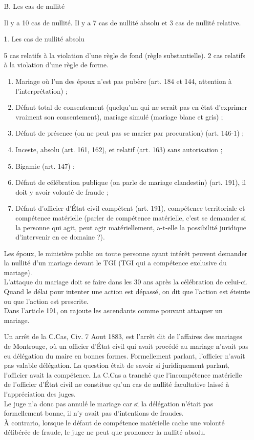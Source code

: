 \documentclass[12pt, a4paper, openany]{book}
\begin{document}
B. Les cas de nullité


Il y a 10 cas de nullité. Il y a 7 cas de nullité absolu et 3 cas de nullité relative. 


1. Les cas de nullité absolu


5 cas relatifs à la violation d'une règle de fond (règle substantielle). 
2 cas relatifs à la violation d'une règle de forme. 

\begin{enumerate}
\item Mariage où l'un des époux n'est pas pubère (art. 184 et 144, attention à l'interprétation) ;
\item Défaut total de consentement (quelqu'un qui ne serait pas en état d'exprimer vraiment son consentement), mariage simulé (mariage blanc et gris) ;
\item Défaut de présence (on ne peut pas se marier par procuration) (art. 146-1) ; 
\item Inceste, absolu (art. 161, 162), et relatif (art. 163) sans autorisation ;
\item Bigamie (art. 147) ; 
\item Défaut de célébration publique (on parle de mariage clandestin) (art. 191), il doit y avoir volonté de fraude ;
\item Défaut d'officier d'État civil compétent (art. 191), compétence territoriale et compétence matérielle (parler de compétence matérielle, c'est se demander si la personne qui agit, peut agir matériellement, a-t-elle la possibilité juridique d'intervenir en ce domaine ?). 
\end{enumerate}

Les époux, le ministère public ou toute personne ayant intérêt peuvent demander la nullité d'un mariage devant le TGI (TGI qui a compétence exclusive du mariage). \\
L'attaque du mariage doit se faire dans les 30 ans après la célébration de celui-ci. Quand le délai pour intenter une action est dépassé, on dit que l'action est éteinte ou que l'action est prescrite.  \\
Dans l'article 191, on rajoute les ascendants comme pouvant attaquer un mariage. 


Un arrêt de la C.Cas, Civ. 7 Aout 1883, est l'arrêt dit de l'affaires des mariages de Montrouge, où un officier d'État civil qui avait procédé au mariage n'avait pas eu délégation du maire en bonnes formes. Formellement parlant, l'officier n'avait pas valable délégation. La question était de savoir si juridiquement parlant, l'officier avait la compétence. La C.Cas a tranché que l'incompétence matérielle de l'officier d'État civil ne constitue qu'un cas de nullité facultative laissé à l'appréciation des juges. \\
Le juge n'a donc pas annulé le mariage car si la délégation n'était pas formellement bonne, il n'y avait pas d'intentions de fraudes. \\
À contrario, lorsque le défaut de compétence matérielle cache une volonté délibérée de fraude, le juge ne peut que prononcer la nullité absolu. 
\end{document}
